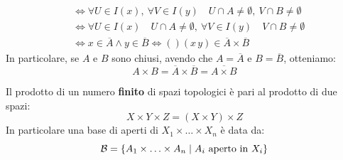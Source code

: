 \begin{demonstration}
\begin{enumerate}[label=\Roman*]
\begin{align*}
&\iff \forall U\in I\left(x\right),\ \forall V\in I\left(y\right)\quad U\cap A\neq \emptyset ,\ V\cap B\neq \emptyset\\
&\iff \forall U\in I\left(x\right)\quad U\cap A\neq \emptyset ,\ \forall V\in I\left(y\right)\quad V\cap B\neq \emptyset\\
&\iff x\in\overline{A}\wedge y\in \overline{B}\iff\left(\right)\left(x\, y\right)\in\overline{A}\times \overline{B}
\end{align*}
In particolare, se $A$ e $B$ sono chiusi, avendo che $A=\overline{A}$ e $B=\overline{B}$, otteniamo:
\begin{equation*}
A\times B=\overline{A}\times \overline{B}=\overline{A\times B}
\end{equation*}
\end{enumerate}
\end{demonstration}
\begin{observe}
Il prodotto di un numero \textbf{finito} di spazi topologici è pari al prodotto di due spazi:
\begin{equation*}
X\times Y\times Z=\left(X\times Y\right)\times Z
\end{equation*}
In particolare una base di aperti di $X_1\times \ldots \times X_n$ è data da:
\begin{equation*}
\mathcal{B}=\left\{A_1\times \ldots \times A_n\mid A_i\text{ aperto in } X_i\right\}
\end{equation*}
\end{observe}
